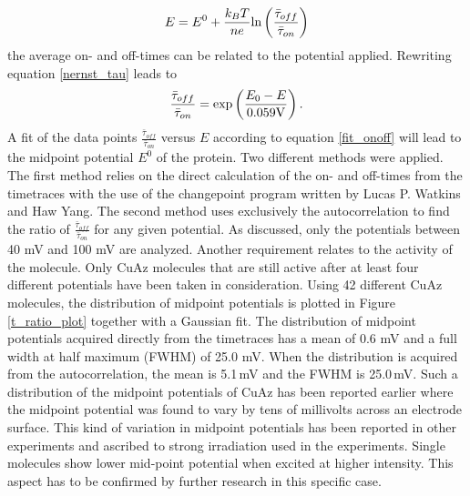 \documentclass[twoside,single]{lion-msc}
\begin{document}
\begin{equation}\label{nernst_tau}
E = E^{0}+\frac{k_{B}T}{ne}\textup{ln}\left ( \frac{\bar{\tau}_{off}}{\bar{\tau}_{on}} \right )
\end{equation}
the average on- and off-times can be related to the potential applied. Rewriting equation \ref{nernst_tau} leads to
\begin{equation}\label{fit_onoff}
\frac{\bar{\tau}_{off}}{\bar{\tau}_{on}} = \textup{exp}\left ( \frac{E_{0}-E}{0.059\textup{V}} \right ).
\end{equation}
A fit of the data points $\frac{\bar{\tau}_{off}}{\bar{\tau}_{on}}$ versus $E$ according to equation \ref{fit_onoff} will lead to the midpoint potential $E^{0}$ of the protein. Two different methods were applied. The first method relies on the direct calculation of the on- and off-times from the timetraces with the use of the changepoint program written by  Lucas P. Watkins and Haw Yang. The second method uses exclusively the autocorrelation to find the ratio of  $\frac{\bar{\tau}_{off}}{\bar{\tau}_{on}}$ for any given potential. As discussed, only the potentials between 40 mV and 100 mV are analyzed. Another requirement relates to the activity of the molecule. Only CuAz molecules that are still active after at least four different potentials have been taken in consideration. Using 42 different CuAz molecules, the distribution of midpoint potentials is plotted in Figure \ref{t_ratio_plot} together with a Gaussian fit. The distribution of midpoint potentials acquired directly from the timetraces has a mean of 0.6 mV and a full width at half maximum (FWHM) of 25.0 mV. When the distribution is acquired from the autocorrelation, the mean is 5.1\,mV and the FWHM is 25.0\,mV. Such a distribution of the midpoint potentials of CuAz has been reported earlier \cite{Salverda2010} where the midpoint potential was found to vary by tens of millivolts across an electrode surface. This kind of variation in midpoint potentials has been reported in other experiments \cite{Zhang2017} and ascribed to strong irradiation used in the experiments. Single molecules show lower mid-point potential when excited at higher intensity. This aspect has to be confirmed by further research in this specific case. 
\end{document}
